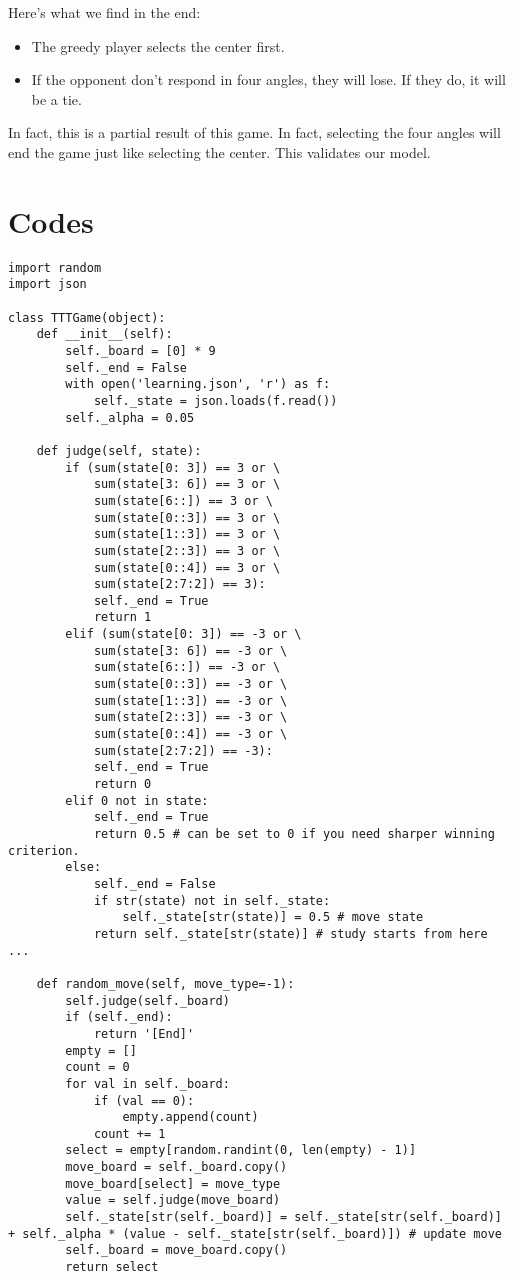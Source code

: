 \documentclass{article}
\begin{document}
Here's what we find in the end:
\begin{itemize}
    \item The greedy player selects the center first.
    \item If the opponent don't respond in four angles, they will lose. If they do, it will be a tie. 
\end{itemize}

In fact, this is a partial result of this game. In fact, selecting the four angles will end the game just like selecting the center. This validates our model.

\appendix
\section{Codes}
\begin{verbatim}
import random
import json

class TTTGame(object):
    def __init__(self):
        self._board = [0] * 9
        self._end = False
        with open('learning.json', 'r') as f:
            self._state = json.loads(f.read())
        self._alpha = 0.05

    def judge(self, state):
        if (sum(state[0: 3]) == 3 or \
            sum(state[3: 6]) == 3 or \
            sum(state[6::]) == 3 or \
            sum(state[0::3]) == 3 or \
            sum(state[1::3]) == 3 or \
            sum(state[2::3]) == 3 or \
            sum(state[0::4]) == 3 or \
            sum(state[2:7:2]) == 3):
            self._end = True
            return 1
        elif (sum(state[0: 3]) == -3 or \
            sum(state[3: 6]) == -3 or \
            sum(state[6::]) == -3 or \
            sum(state[0::3]) == -3 or \
            sum(state[1::3]) == -3 or \
            sum(state[2::3]) == -3 or \
            sum(state[0::4]) == -3 or \
            sum(state[2:7:2]) == -3):
            self._end = True
            return 0
        elif 0 not in state:
            self._end = True
            return 0.5 # can be set to 0 if you need sharper winning criterion.
        else:
            self._end = False
            if str(state) not in self._state:
                self._state[str(state)] = 0.5 # move state
            return self._state[str(state)] # study starts from here ...

    def random_move(self, move_type=-1):
        self.judge(self._board)
        if (self._end):
            return '[End]'
        empty = []
        count = 0
        for val in self._board:
            if (val == 0):
                empty.append(count)
            count += 1
        select = empty[random.randint(0, len(empty) - 1)]
        move_board = self._board.copy()
        move_board[select] = move_type
        value = self.judge(move_board)
        self._state[str(self._board)] = self._state[str(self._board)] + self._alpha * (value - self._state[str(self._board)]) # update move 
        self._board = move_board.copy()
        return select


\end{verbatim}
\end{document}
